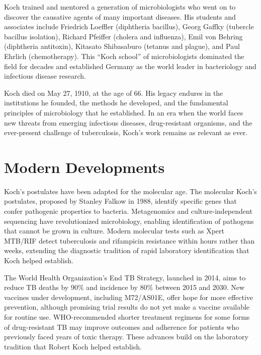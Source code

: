 Koch trained and mentored a generation of microbiologists who went on to discover the causative agents of many important diseases. His students and associates include Friedrich Loeffler (diphtheria bacillus), Georg Gaffky (tubercle bacillus isolation), Richard Pfeiffer (cholera and influenza), Emil von Behring (diphtheria antitoxin), Kitasato Shibasaburo (tetanus and plague), and Paul Ehrlich (chemotherapy). This ``Koch school'' of microbiologists dominated the field for decades and established Germany as the world leader in bacteriology and infectious disease research.

Koch died on May 27, 1910, at the age of 66. His legacy endures in the institutions he founded, the methods he developed, and the fundamental principles of microbiology that he established. In an era when the world faces new threats from emerging infectious diseases, drug-resistant organisms, and the ever-present challenge of tuberculosis, Koch's work remains as relevant as ever.

\section{Modern Developments}

Koch's postulates have been adapted for the molecular age. The molecular Koch's postulates, proposed by Stanley Falkow in 1988, identify specific genes that confer pathogenic properties to bacteria. Metagenomics and culture-independent sequencing have revolutionized microbiology, enabling identification of pathogens that cannot be grown in culture. Modern molecular tests such as Xpert MTB/RIF detect tuberculosis and rifampicin resistance within hours rather than weeks, extending the diagnostic tradition of rapid laboratory identification that Koch helped establish.

The World Health Organization's End TB Strategy, launched in 2014, aims to reduce TB deaths by 90\% and incidence by 80\% between 2015 and 2030. New vaccines under development, including M72/AS01E, offer hope for more effective prevention, although promising trial results do not yet make a vaccine available for routine use. WHO-recommended shorter treatment regimens for some forms of drug-resistant TB may improve outcomes and adherence for patients who previously faced years of toxic therapy. These advances build on the laboratory tradition that Robert Koch helped establish.\cite{who-tb}


